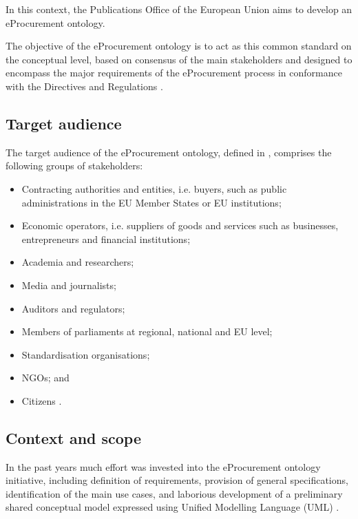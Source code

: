 	In this context, the Publications Office of the European Union aims to develop an eProcurement ontology.
	
	The objective of the eProcurement ontology is to act as this common standard on the	conceptual level, based on consensus of the main stakeholders and designed to encompass the major requirements of the eProcurement process in conformance with the Directives and Regulations \citep{directive-2014/23/EU,directive-2014/24/EU,directive-2014/25/EU,directive-2014/55/EU}.
	
	\subsection{Target audience}
	\label{sec:audience}
	
	The target audience of the eProcurement ontology, defined in \citep{d4.07-2016}, comprises the following groups of stakeholders:
	\begin{itemize}
		\item Contracting authorities and entities, i.e. buyers, such as public administrations in the EU Member States or EU institutions;
		\item Economic operators, i.e. suppliers of goods and services such as businesses, entrepreneurs and financial institutions;
		\item Academia and researchers;
		\item Media and journalists;
		\item Auditors and regulators;
		\item Members of parliaments at regional, national and EU level;
		\item Standardisation organisations;
		\item NGOs; and
		\item Citizens \cite{d4.07-2016}.
	\end{itemize}	
	
	\subsection{Context and scope}
	\label{sec:context}
	
	In the past years much effort was invested into the eProcurement ontology initiative, including definition of requirements, provision of general specifications, identification of the main use cases, and laborious development of a preliminary shared conceptual model expressed using Unified Modelling Language (UML) \cite{uml-userguide,uml2.5}. 
	
